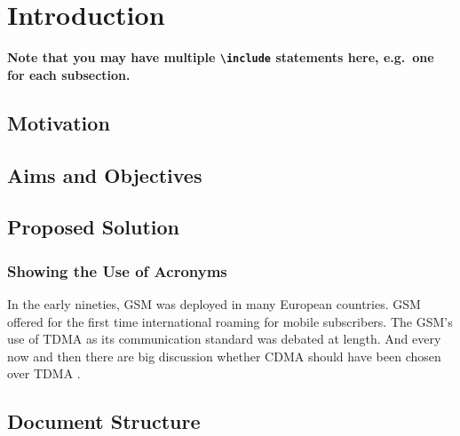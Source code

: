 \chapter{Introduction}

\textbf{Note that you may have multiple \texttt{{\textbackslash}include} statements here, e.g.\ one for each subsection.}

\section{Motivation} %

\section{Aims and Objectives} 


\section{Proposed Solution} 




\subsection{Showing the Use of Acronyms}

In the early nineties, \acs{GSM} was deployed in many European countries. \ac{GSM} offered for the first time international roaming for mobile subscribers. The \acs{GSM}’s use of \ac{TDMA} as its communication standard was debated at length. And every now and then there are big discussion whether \ac{CDMA} should have been chosen over \ac{TDMA} \cite{Do2018AInjection}.



\section{Document Structure}
